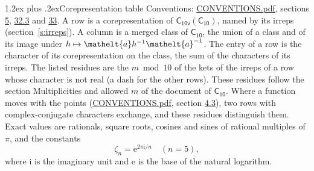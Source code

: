 \documentclass[10pt,a4paper]{article}
\makeatletter
\renewcommand\section{\@startsection{section}{1}{\z@}{-3ex plus -1ex minus -.2ex}%
  {1.2ex plus .2ex}{\normalfont\large\sffamily\bfseries\color{parttitle}}}
\numberwithin{equation}{section}
\newcommand{\eltfont}[1]{{\let\sigma\eltsigma\mathelt{#1}}}
\newcommand{\grp}[1]{\mathsf{#1}}
\newcommand{\elt}[1]{\eltfont{#1}}
\newcommand{\iunit}{\mathrm{i}}
\newcommand{\expe}{\mathrm{e}}
\newcommand{\rootunity}[1]{\zeta_{#1}}
\makeatother
\begin{document}
\section{Corepresentation table}\label{s:character_table}
Conventions: \href{../../CONVENTIONS.pdf}{CONVENTIONS.pdf}, sections \href{../../../rotation/CONVENTIONS.pdf\#conv.5}{5}, \href{../../CONVENTIONS.pdf\#conv.32.3}{32.3} and \href{../../CONVENTIONS.pdf\#conv.33}{33}.
A row is a corepresentation of $\grp{C_{10v}}(\grp{C_{10}})$, named by its irreps (section~\ref{s:irreps}). A column is a merged class of $\grp{C_{10}}$, the union of a class and of its image under $h \mapsto \elt{a} h^{-1} \elt{a}^{-1}$. The entry of a row is the character of its corepresentation on the class, the sum of the characters of its irreps.
\leavevmode\label{n:head.parity}The listed residues are the $m \bmod 10$ of the kets of the irreps of a row whose character is not real (a dash for the other rows). These residues follow the section Multiplicities and allowed $m$ of the document of \href{../../../rotation/data/pdf/C10.pdf}{$\grp{C_{10}}$}. Where a function moves with the points (\href{../../CONVENTIONS.pdf}{CONVENTIONS.pdf}, section \href{../../../rotation/CONVENTIONS.pdf\#conv.4.3}{4.3}), two rows with complex-conjugate characters exchange, and these residues distinguish them.
\leavevmode\label{n:constant.root}\label{n:index.root.order}Exact values are rationals, square roots, cosines and sines of rational multiples of $\pi$, and the constants
\begin{equation}\label{e:constants}\rootunity{n} = \expe^{2\pi\iunit/n}\quad(n = 5),\end{equation}
where $\iunit$ is the imaginary unit and $\expe$ is the base of the natural logarithm.
\end{document}
